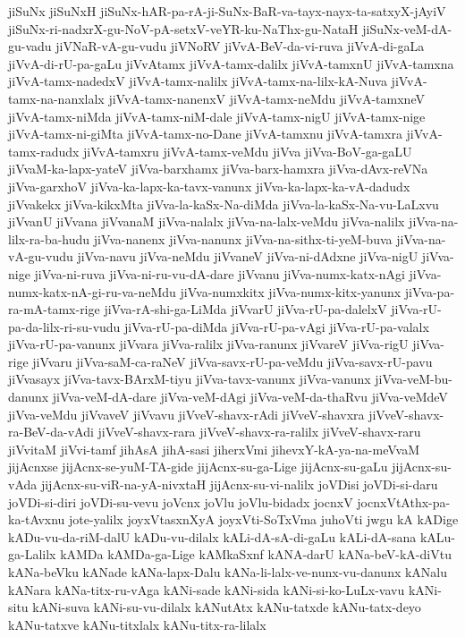 {jiSuNx
jiSuNxH
jiSuNx-hAR-pa-rA-ji-SuNx-BaR-va-tayx-nayx-ta-satxyX-jAyiV
jiSuNx-ri-nadxrX-gu-NoV-pA-setxV-veYR-ku-NaThx-gu-NataH
jiSuNx-veM-dA-gu-vadu
jiVNaR-vA-gu-vudu
jiVNoRV
jiVvA-BeV-da-vi-ruva
jiVvA-di-gaLa
jiVvA-di-rU-pa-gaLu
jiVvAtamx
jiVvA-tamx-dalilx
jiVvA-tamxnU
jiVvA-tamxna
jiVvA-tamx-nadedxV
jiVvA-tamx-nalilx
jiVvA-tamx-na-lilx-kA-Nuva
jiVvA-tamx-na-nanxlalx
jiVvA-tamx-nanenxV
jiVvA-tamx-neMdu
jiVvA-tamxneV
jiVvA-tamx-niMda
jiVvA-tamx-niM-dale
jiVvA-tamx-nigU
jiVvA-tamx-nige
jiVvA-tamx-ni-giMta
jiVvA-tamx-no-Dane
jiVvA-tamxnu
jiVvA-tamxra
jiVvA-tamx-radudx
jiVvA-tamxru
jiVvA-tamx-veMdu
jiVva
jiVva-BoV-ga-gaLU
jiVvaM-ka-lapx-yateV
jiVva-barxhamx
jiVva-barx-hamxra
jiVva-dAvx-reVNa
jiVva-garxhoV
jiVva-ka-lapx-ka-tavx-vanunx
jiVva-ka-lapx-ka-vA-dadudx
jiVvakekx
jiVva-kikxMta
jiVva-la-kaSx-Na-diMda
jiVva-la-kaSx-Na-vu-LaLxvu
jiVvanU
jiVvana
jiVvanaM
jiVva-nalalx
jiVva-na-lalx-veMdu
jiVva-nalilx
jiVva-na-lilx-ra-ba-hudu
jiVva-nanenx
jiVva-nanunx
jiVva-na-sithx-ti-yeM-buva
jiVva-na-vA-gu-vudu
jiVva-navu
jiVva-neMdu
jiVvaneV
jiVva-ni-dAdxne
jiVva-nigU
jiVva-nige
jiVva-ni-ruva
jiVva-ni-ru-vu-dA-dare
jiVvanu
jiVva-numx-katx-nAgi
jiVva-numx-katx-nA-gi-ru-va-neMdu
jiVva-numxkitx
jiVva-numx-kitx-yanunx
jiVva-pa-ra-mA-tamx-rige
jiVva-rA-shi-ga-LiMda
jiVvarU
jiVva-rU-pa-dalelxV
jiVva-rU-pa-da-lilx-ri-su-vudu
jiVva-rU-pa-diMda
jiVva-rU-pa-vAgi
jiVva-rU-pa-valalx
jiVva-rU-pa-vanunx
jiVvara
jiVva-ralilx
jiVva-ranunx
jiVvareV
jiVva-rigU
jiVva-rige
jiVvaru
jiVva-saM-ca-raNeV
jiVva-savx-rU-pa-veMdu
jiVva-savx-rU-pavu
jiVvasayx
jiVva-tavx-BArxM-tiyu
jiVva-tavx-vanunx
jiVva-vanunx
jiVva-veM-bu-danunx
jiVva-veM-dA-dare
jiVva-veM-dAgi
jiVva-veM-da-thaRvu
jiVva-veMdeV
jiVva-veMdu
jiVvaveV
jiVvavu
jiVveV-shavx-rAdi
jiVveV-shavxra
jiVveV-shavx-ra-BeV-da-vAdi
jiVveV-shavx-rara
jiVveV-shavx-ra-ralilx
jiVveV-shavx-raru
jiVvitaM
jiVvi-tamf
jihAsA
jihA-sasi
jiherxVmi
jihevxY-kA-ya-na-meVvaM
jijAcnxse
jijAcnx-se-yuM-TA-gide
jijAcnx-su-ga-Lige
jijAcnx-su-gaLu
jijAcnx-su-vAda
jijAcnx-su-viR-na-yA-nivxtaH
jijAcnx-su-vi-nalilx
joVDisi
joVDi-si-daru
joVDi-si-diri
joVDi-su-vevu
joVcnx
joVlu
joVlu-bidadx
jocnxV
jocnxVtAthx-pa-ka-tAvxnu
jote-yalilx
joyxVtasxnXyA
joyxVti-SoTxVma
juhoVti
jwgu
kA
kADige
kADu-vu-da-riM-dalU
kADu-vu-dilalx
kALi-dA-sA-di-gaLu
kALi-dA-sana
kALu-ga-Lalilx
kAMDa
kAMDa-ga-Lige
kAMkaSxnf
kANA-darU
kANa-beV-kA-diVtu
kANa-beVku
kANade
kANa-lapx-Dalu
kANa-li-lalx-ve-nunx-vu-danunx
kANalu
kANara
kANa-titx-ru-vAga
kANi-sade
kANi-sida
kANi-si-ko-LuLx-vavu
kANi-situ
kANi-suva
kANi-su-vu-dilalx
kANutAtx
kANu-tatxde
kANu-tatx-deyo
kANu-tatxve
kANu-titxlalx
kANu-titx-ra-lilalx
}
